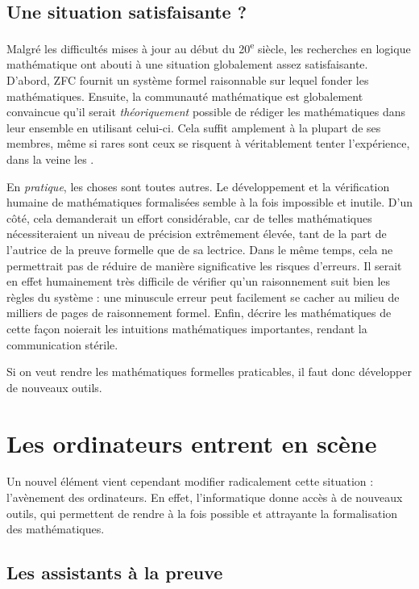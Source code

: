 \subsection{Une situation satisfaisante ?}

Malgré les difficultés mises à jour au début du 20\textsuperscript{e}
siècle, les recherches en logique mathématique ont abouti à une situation
globalement assez satisfaisante. D’abord, ZFC fournit un système formel raisonnable sur
lequel fonder les mathématiques. Ensuite,
la communauté mathématique est globalement convaincue qu’il serait
\emph{théoriquement} possible de rédiger les mathématiques dans leur ensemble
en utilisant celui-ci. Cela suffit amplement à la plupart de ses membres,
même si rares sont ceux se risquent à véritablement tenter l’expérience, dans la veine
les .

En \emph{pratique}, les choses sont toutes autres.
Le développement et la vérification humaine de mathématiques
formalisées%
semble à la fois impossible et inutile.
D’un côté, cela demanderait un effort considérable, car de telles mathématiques
nécessiteraient un niveau de précision extrêmement élevée, tant de la part de l’autrice
de la preuve formelle que de sa lectrice.
Dans le même temps, cela ne permettrait pas de réduire de manière significative
les risques d’erreurs. Il serait en effet
humainement très difficile de vérifier qu’un raisonnement suit bien les règles du
système : une minuscule erreur peut facilement se cacher au milieu de
milliers de pages de raisonnement formel.
Enfin, décrire les mathématiques de cette façon noierait
les intuitions mathématiques importantes, rendant la communication stérile.

Si on veut rendre les mathématiques formelles praticables, il faut donc développer
de nouveaux outils.

\section{Les ordinateurs entrent en scène}
\label{sec:assistants-preuve}

Un nouvel élément vient cependant modifier radicalement cette situation :
l’avènement des ordinateurs. En effet, l’informatique donne accès à de nouveaux outils,
qui permettent de rendre à la fois possible et attrayante la formalisation
des mathématiques.

\subsection{Les assistants à la preuve}

